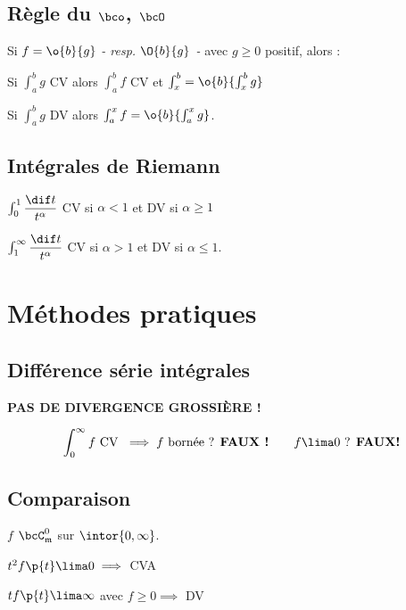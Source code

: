 \documentclass[a4paper,french,bookmarks]{book}
\begin{document}
    \subsection{Règle du $\bco$, $\bcO$}
    
    Si $f = \o{b}{g}$ \emph{- resp. $\O{b}{g}$ -} avec $g \geq 0$ positif, alors :
    \begin{enumerate}
        \itt Si $\int_a^b g$ CV alors $\int_a^b f$ CV et $\int_x^b = \o{b}{\int_x^b g}$
        
        \itt Si $\int_a^b g$ DV alors $\int_a^x f = \o{b}{\int_a^x g}$.
    \end{enumerate}
    
    \subsection{Intégrales de Riemann}
    
    \begin{enumerate}
        \itt $\int_0^1 \dfrac{\dif t}{t^\alpha}$ CV si $\alpha < 1$ et DV si $\alpha \geq 1$
        
        \itt $\int_1^\infty \dfrac{\dif t}{t^\alpha}$ CV si $\alpha > 1$ et DV si $\alpha \leq 1$.
    \end{enumerate}
    
    \section{Méthodes pratiques}
    
    \subsection{Différence série intégrales}
    
    \begin{warning}{}{}
        \bf{PAS DE DIVERGENCE GROSSIÈRE !}
        
        \[ \int_0^\infty f \text{ CV } \implies f \text{ bornée ? \bf{FAUX !}} \qquad f \lima 0 \text{ ? \bf{FAUX!}}\]
    \end{warning}
    
    \subsection{Comparaison}
    
    $f$ $\bcC^0_{\mathfrak{m}}$ sur $\intor{0, \infty}$. 
    
    \begin{enumerate}
        \itt $t^2f\p{t} \lima 0 \implies$ CVA
        
        \itt $tf\p{t} \lima \infty$ avec $f \geq 0 \implies$ DV
    \end{enumerate}
    
\end{document}
